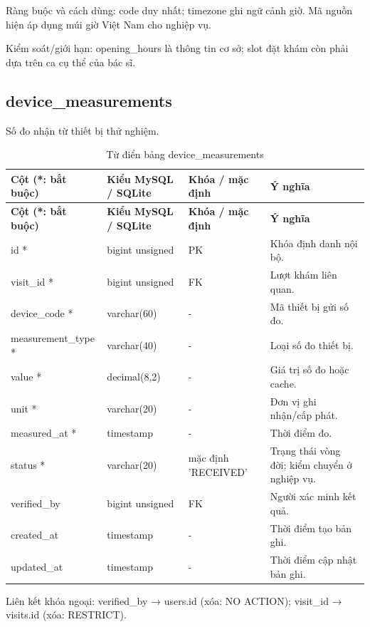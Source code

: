 Ràng buộc và cách dùng:\allowbreak{} code duy nhất; timezone ghi ngữ cảnh giờ.\allowbreak{} Mã nguồn hiện áp dụng múi giờ Việt Nam cho nghiệp vụ.\allowbreak{}

Kiểm soát/\allowbreak{}giới hạn:\allowbreak{} opening\_\allowbreak{}hours là thông tin cơ sở; slot đặt khám còn phải dựa trên ca cụ thể của bác sĩ.\allowbreak{}

\clearpage

\subsection{device\_\allowbreak{}measurements}
Số đo nhận từ thiết bị thử nghiệm.\allowbreak{}


{\fontsize{10}{12}\selectfont\setlength{\tabcolsep}{3pt}\renewcommand{\arraystretch}{1.12}
\begin{longtable}{@{}L{\textwidth-4.86pt\relax} L{\textwidth-3.96pt\relax} L{\textwidth-2.88pt\relax} L{\textwidth-6.3pt\relax}@{}}
\caption{Từ điển bảng device\_\allowbreak{}measurements}\\
\toprule
\textbf{Cột (*:\allowbreak{} bắt buộc)} & \textbf{Kiểu My\allowbreak{}SQL /\allowbreak{} SQLite} & \textbf{Khóa /\allowbreak{} mặc định} & \textbf{Ý nghĩa}\\\midrule
\endfirsthead
\toprule
\textbf{Cột (*:\allowbreak{} bắt buộc)} & \textbf{Kiểu My\allowbreak{}SQL /\allowbreak{} SQLite} & \textbf{Khóa /\allowbreak{} mặc định} & \textbf{Ý nghĩa}\\\midrule
\endhead
\bottomrule\endlastfoot
id * & bigint unsigned & PK & Khóa định danh nội bộ.\allowbreak{}\\[1pt]
visit\_\allowbreak{}id * & bigint unsigned & FK & Lượt khám liên quan.\allowbreak{}\\[1pt]
device\_\allowbreak{}code * & varchar(60) & - & Mã thiết bị gửi số đo.\allowbreak{}\\[1pt]
measurement\_\allowbreak{}type * & varchar(40) & - & Loại số đo thiết bị.\allowbreak{}\\[1pt]
value * & decimal(8,2) & - & Giá trị số đo hoặc cache.\allowbreak{}\\[1pt]
unit * & varchar(20) & - & Đơn vị ghi nhận/\allowbreak{}cấp phát.\allowbreak{}\\[1pt]
measured\_\allowbreak{}at * & timestamp & - & Thời điểm đo.\allowbreak{}\\[1pt]
status * & varchar(20) & mặc định 'RECEIVED' & Trạng thái vòng đời; kiểm chuyển ở nghiệp vụ.\allowbreak{}\\[1pt]
verified\_\allowbreak{}by & bigint unsigned & FK & Người xác minh kết quả.\allowbreak{}\\[1pt]
created\_\allowbreak{}at & timestamp & - & Thời điểm tạo bản ghi.\allowbreak{}\\[1pt]
updated\_\allowbreak{}at & timestamp & - & Thời điểm cập nhật bản ghi.\allowbreak{}\\[1pt]
\end{longtable}}
Liên kết khóa ngoại:\allowbreak{} verified\_\allowbreak{}by → users.\allowbreak{}id (xóa:\allowbreak{} NO ACTION); visit\_\allowbreak{}id → visits.\allowbreak{}id (xóa:\allowbreak{} RESTRICT).\allowbreak{}

